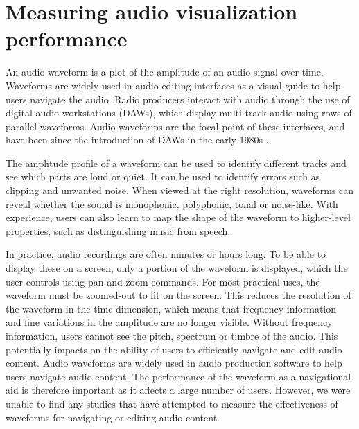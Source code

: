 \chapter{Measuring audio visualization performance}\label{chp:colourised}

An audio waveform is a plot of the amplitude of an audio signal over time. Waveforms are widely used in audio editing
interfaces as a visual guide to help users navigate the audio. Radio producers interact with audio through the use of
digital audio workstations (DAWs), which display multi-track audio using rows of parallel waveforms. Audio waveforms
are the focal point of these interfaces, and have been since the introduction of DAWs in the early 1980s
\citep{Ingebretsen1982}.

The amplitude profile of a waveform can be used to identify different tracks and see which parts are loud or quiet. It
can be used to identify errors such as clipping and unwanted noise. When viewed at the right resolution, waveforms can
reveal whether the sound is monophonic, polyphonic, tonal or noise-like.  With experience, users can also learn to
map the shape of the waveform to higher-level properties, such as distinguishing music from speech.

In practice, audio recordings are often minutes or hours long. To be able to display these on a screen, only a portion
of the waveform is displayed, which the user controls using pan and zoom commands.  For most practical uses, the
waveform must be zoomed-out to fit on the screen. This reduces the resolution of the waveform in the time dimension,
which means that frequency information and fine variations in the amplitude are no longer visible.  Without frequency
information, users cannot see the pitch, spectrum or timbre of the audio.  This potentially impacts on the ability of
users to efficiently navigate and edit audio content.  Audio waveforms are widely used in audio production software to
help users navigate audio content. The performance of the waveform as a navigational aid is therefore 
important as it affects a large number of users.  However, we were unable to find any studies that have attempted to
measure the effectiveness of waveforms for navigating or editing audio content.



